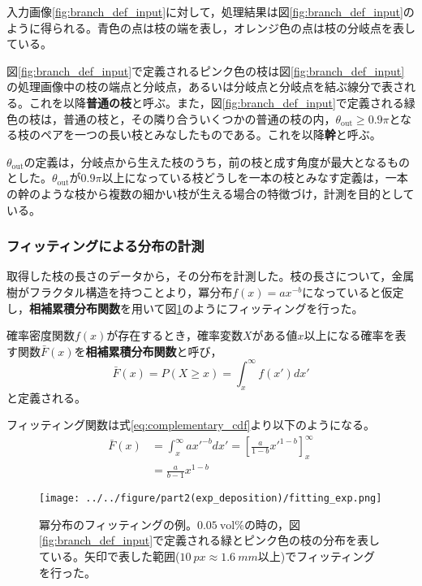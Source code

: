 \documentclass[autodetect-engine,dvi=dvipdfmx,a4paper,ja=standard,oneside,openany,11pt]{bxjsbook}
\begin{document}
入力画像\ref{fig:branch_def_input}に対して，処理結果は図\ref{fig:branch_def_input}のように得られる。青色の点は枝の端を表し，オレンジ色の点は枝の分岐点を表している。

図\ref{fig:branch_def_input}で定義されるピンク色の枝は図\ref{fig:branch_def_input}の処理画像中の枝の端点と分岐点，あるいは分岐点と分岐点を結ぶ線分で表される。これを以降\textbf{普通の枝}と呼ぶ。また，図\ref{fig:branch_def_input}で定義される緑色の枝は，普通の枝と，その隣り合ういくつかの普通の枝の内，$\theta_{\mathrm{out}}\geq 0.9\pi$となる枝のペアを一つの長い枝とみなしたものである。これを以降\textbf{幹}と呼ぶ。

$\theta_{\mathrm{out}}$の定義は，分岐点から生えた枝のうち，前の枝と成す角度が最大となるものとした。$\theta_{\mathrm{out}}$が$0.9\pi$以上になっている枝どうしを一本の枝とみなす定義は，一本の幹のような枝から複数の細かい枝が生える場合の特徴づけ，計測を目的としている。

\subsubsection{フィッティングによる分布の計測}
取得した枝の長さのデータから，その分布を計測した。枝の長さについて，金属樹がフラクタル構造を持つことより，冪分布$f(x)=ax^{-b}$になっていると仮定し，\textbf{相補累積分布関数}を用いて図\ref{fig:fitting_exp}のようにフィッティングを行った。

確率密度関数$f(x)$が存在するとき，確率変数$X$がある値$x$以上になる確率を表す関数$\bar{F}(x)$を\textbf{相補累積分布関数}と呼び，
\begin{equation}
  \bar{F}(x) = P(X \geq x) = \int_{x}^{\infty} f(x')dx'
  \label{eq:complementary_cdf}
\end{equation}
と定義される。

フィッティング関数は式\eqref{eq:complementary_cdf}より以下のようになる。
\begin{equation}
  \begin{split}
    \bar{F}(x) & = \int_{x}^{\infty} ax'^{-b}dx' = \left[ \frac{a}{1-b}x'^{1-b} \right]_{x}^{\infty} \\
               & = \frac{a}{b-1}x^{1-b}
  \end{split}
\end{equation}

\begin{figure}[htbp]
  \centering
  \texttt{[image: ../../figure/part2(exp\_deposition)/fitting\_exp.png]}
  \caption{冪分布のフィッティングの例。$\SI{0.05}{\mathrm{vol}\%}$の時の，図\ref{fig:branch_def_input}で定義される緑とピンク色の枝の分布を表している。矢印で表した範囲($\SI{10}{px}\approx\SI{1.6}{mm}$以上)でフィッティングを行った。}
  \label{fig:fitting_exp}
\end{figure}
\end{document}
